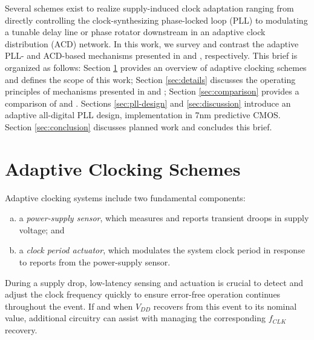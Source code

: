 \documentclass[twoside,9pt,journal,letterpage]{IEEEtran}
\begin{document}
Several schemes exist to realize supply-induced clock adaptation ranging from directly controlling the clock-synthesizing phase-locked loop (PLL)\cite{ahmad2017,hashimoto2018} to modulating a tunable delay line or phase rotator downstream in an adaptive clock distribution (ACD) network\cite{bowman2016,floyd2017,wilcox2015,kwak2016self}. In this work, we survey and contrast the adaptive PLL- and ACD-based mechanisms presented in \cite{hashimoto2018} and \cite{wilcox2015}, respectively. This brief is organized as follows: Section \ref{sec:overview} provides an overview of adaptive clocking schemes and defines the scope of this work; Section \ref{sec:details} discusses the operating principles of mechanisms presented in \cite{hashimoto2018} and \cite{wilcox2015}; Section \ref{sec:comparison} provides a comparison of \cite{hashimoto2018} and \cite{wilcox2015}. Sections \ref{sec:pll-design} and \ref{sec:discussion} introduce an adaptive all-digital PLL design, implementation in 7nm predictive CMOS. Section \ref{sec:conclusion} discusses planned work and concludes this brief.

\IEEEpubidadjcol

\vspace{-10pt}
\section{Adaptive Clocking Schemes}
\label{sec:overview}

Adaptive clocking systems include two fundamental components:

\begin{enumerate}[(a)]
\item a \textit{power-supply sensor}, which measures and
reports transient droops in supply voltage; and
\item a \textit{clock period actuator}, which modulates the
system clock period in response to reports from
the power-supply sensor.
\end{enumerate}

During a supply drop, low-latency sensing and actuation is crucial to detect and adjust the clock frequency quickly to ensure error-free operation continues throughout the event. If and when $V_{DD}$ recovers from this event to its nominal value, additional circuitry can assist with managing the corresponding $f_{CLK}$ recovery.
\end{document}
